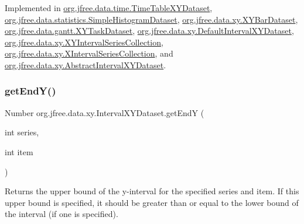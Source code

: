 Implemented in \mbox{\hyperlink{classorg_1_1jfree_1_1data_1_1time_1_1_time_table_x_y_dataset_a436f721f4b20c9209b8fdc9b3e947e62}{org.\+jfree.\+data.\+time.\+Time\+Table\+X\+Y\+Dataset}}, \mbox{\hyperlink{classorg_1_1jfree_1_1data_1_1statistics_1_1_simple_histogram_dataset_acad8234cbd7d6fa06c8202e807c066a7}{org.\+jfree.\+data.\+statistics.\+Simple\+Histogram\+Dataset}}, \mbox{\hyperlink{classorg_1_1jfree_1_1data_1_1xy_1_1_x_y_bar_dataset_af131ec7a0e1416df72f14cee94fe8cd0}{org.\+jfree.\+data.\+xy.\+X\+Y\+Bar\+Dataset}}, \mbox{\hyperlink{classorg_1_1jfree_1_1data_1_1gantt_1_1_x_y_task_dataset_a547af5fef423693d0b96a4a89060f8b8}{org.\+jfree.\+data.\+gantt.\+X\+Y\+Task\+Dataset}}, \mbox{\hyperlink{classorg_1_1jfree_1_1data_1_1xy_1_1_default_interval_x_y_dataset_aa54ecfa001d13ac8b1bab7e0a66d13a8}{org.\+jfree.\+data.\+xy.\+Default\+Interval\+X\+Y\+Dataset}}, \mbox{\hyperlink{classorg_1_1jfree_1_1data_1_1xy_1_1_x_y_interval_series_collection_ae3675851fa4f1058f12edc92fd6fa997}{org.\+jfree.\+data.\+xy.\+X\+Y\+Interval\+Series\+Collection}}, \mbox{\hyperlink{classorg_1_1jfree_1_1data_1_1xy_1_1_x_interval_series_collection_a3bcdb47fcb343fb9e117537501457570}{org.\+jfree.\+data.\+xy.\+X\+Interval\+Series\+Collection}}, and \mbox{\hyperlink{classorg_1_1jfree_1_1data_1_1xy_1_1_abstract_interval_x_y_dataset_ac91570775b0aff8d6acf1316a87ea551}{org.\+jfree.\+data.\+xy.\+Abstract\+Interval\+X\+Y\+Dataset}}.

\mbox{\label{interfaceorg_1_1jfree_1_1data_1_1xy_1_1_interval_x_y_dataset_ae938af574bad07e7f47a8b423223ef9b}} 
\subsubsection{\texorpdfstring{get\+End\+Y()}{getEndY()}}
{\footnotesize\ttfamily Number org.\+jfree.\+data.\+xy.\+Interval\+X\+Y\+Dataset.\+get\+EndY (\begin{DoxyParamCaption}\item[{int}]{series,  }\item[{int}]{item }\end{DoxyParamCaption})}

Returns the upper bound of the y-\/interval for the specified series and item. If this upper bound is specified, it should be greater than or equal to the lower bound of the interval (if one is specified).


